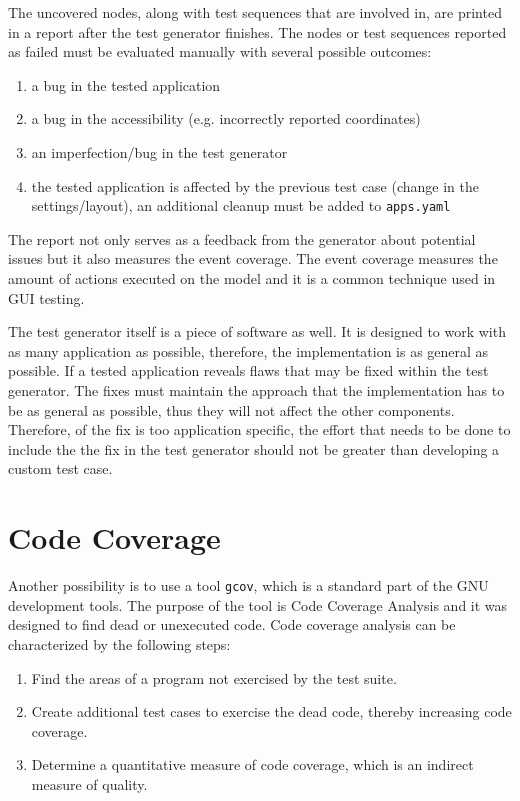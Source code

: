 The uncovered nodes, along with test sequences that are involved in, are printed in a report after the test generator finishes.  The nodes or test sequences reported as failed must be evaluated manually with several possible outcomes:
\begin{enumerate}
    \item a bug in the tested application
    \item a bug in the accessibility (e.g. incorrectly reported coordinates)
    \item an imperfection/bug in the test generator
    \item the tested application is affected by the previous test case (change in the settings/layout), an additional cleanup must be added to \texttt{apps.yaml}
\end{enumerate}
The report not only serves as a feedback from the generator about potential issues but it also measures the event coverage. The event coverage measures the amount of actions executed on the model and it is a common technique used in GUI testing\cite{NguyenBao2014Gait}.

The test generator itself is a piece of software as well. It is designed to work with as many application as possible, therefore, the implementation is as general as possible. If a tested application reveals flaws that may be fixed within the test generator. The fixes must maintain the approach that the implementation has to be as general as possible, thus they will not affect the other components. Therefore, of the fix is too application specific, the effort that needs to be done to include the the fix in the test generator should not be greater than developing a custom test case.

\section{Code Coverage}
Another possibility is to use a tool \verb|gcov|, which is a standard part of the GNU development tools. The purpose of the tool is Code Coverage Analysis and it was designed to find dead or unexecuted code. Code coverage analysis can be characterized by the following steps: 
\begin{enumerate}
  \item Find the areas of a program not exercised by the test suite.
  \item Create additional test cases to exercise the dead code, thereby increasing code coverage.
  \item Determine a quantitative measure of code coverage, which is an indirect measure of quality.
\end{enumerate}

